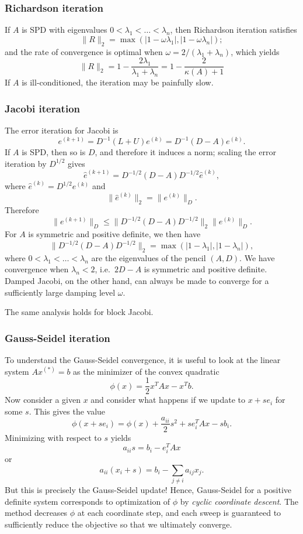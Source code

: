 \documentclass[12pt, leqno]{article} %
\begin{document}
\subsubsection{Richardson iteration}

If $A$ is SPD with eigenvalues
$0 < \lambda_1 < \ldots < \lambda_n$, then Richardson
iteration satisfies
\[
  \|R\|_2 = \max(|1-\omega \lambda_1|, |1-\omega \lambda_n|);
\]
and the rate of convergence is optimal when
$\omega = 2/(\lambda_1 + \lambda_n)$,
which yields
\[
  \|R\|_2
    = 1 - \frac{2 \lambda_1}{\lambda_1 + \lambda_n}
    = 1 - \frac{2}{\kappa(A) + 1}
\]
If $A$ is ill-conditioned, the iteration may be painfully slow.

\subsubsection{Jacobi iteration}

The error iteration for Jacobi is
\[
  e^{(k+1)} = D^{-1} (L+U) e^{(k)} = D^{-1} (D-A) e^{(k)}.
\]
If $A$ is SPD, then so is $D$, and therefore it induces a norm;
scaling the error iteration by $D^{1/2}$ gives
\[
  \hat{e}^{(k+1)} = D^{-1/2} (D-A) D^{-1/2} \hat{e}^{(k)},
\]
where $\hat{e}^{(k)} = D^{1/2} e^{(k)}$ and
\[
  \|\hat{e}^{(k)}\|_2 = \|e^{(k)}\|_D.
\]
Therefore
\[
  \|e^{(k+1)}\|_D \leq \|D^{-1/2} (D-A) D^{-1/2}\|_2 \|e^{(k)}\|_D.
\]
For $A$ is symmetric and positive definite, we then have
\[
  \| D^{-1/2} (D-A) D^{-1/2} \|_2 = \max(|1-\lambda_1|, |1-\lambda_n|),
\]
where $0 < \lambda_1 < \ldots < \lambda_n$ are the eigenvalues of the
pencil $(A,D)$.  We have convergence when $\lambda_n < 2$,
i.e.~$2D-A$ is symmetric and positive definite.  Damped Jacobi, on
the other hand, can always be made to converge for a sufficiently
large damping level $\omega$.

The same analysis holds for block Jacobi.

\subsubsection{Gauss-Seidel iteration}

To understand the Gauss-Seidel convergence, it is useful to look at
the linear system $Ax^{(*)} = b$ as the minimizer of the convex quadratic
\[
  \phi(x) = \frac{1}{2} x^T A x - x^T b.
\]
Now consider a given $x$ and consider what happens if we update to
$x + s e_i$ for some $s$.  This gives the value
\[
  \phi(x+s e_i) = \phi(x) + \frac{a_{ii}}{2} s^2 + s e_i^T A x - s b_i.
\]
Minimizing with respect to $s$ yields
\[
  a_{ii} s = b_i - e_i^T A x
\]
or
\[
  a_{ii} (x_i + s) = b_i - \sum_{j \neq i} a_{ij} x_j.
\]
But this is precisely the Gauss-Seidel update!  Hence, Gauss-Seidel for
a positive definite system corresponds to optimization of $\phi$ by
{\em cyclic coordinate descent}.  The method decreases $\phi$ at each
coordinate step, and each sweep is guaranteed to sufficiently reduce
the objective so that we ultimately converge.
\end{document}
